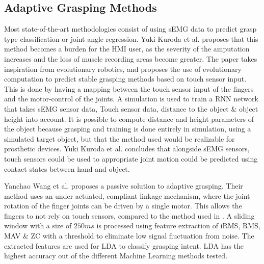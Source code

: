 \documentclass[../main.tex]{subfiles}
\begin{document}
\subsection{Adaptive Grasping Methods}
Most state-of-the-art methodologies consist of using sEMG data to predict grasp type classification or joint angle regression.
Yuki Kuroda et al. \cite{Yuki2023} proposes that this method becomes a burden for the \gls{HMI} user, as the severity of the amputation increases and the loss of muscle recording areas become greater.
The paper takes inspiration from evolutionary robotics, and proposes the use of evolutionary computation to predict stable grasping methods based on touch sensor input.
This is done by having a mapping between the touch sensor input of the fingers and the motor-control of the joints.
A simulation is used to train a \gls{RNN} network that takes sEMG sensor data, Touch sensor data, distance to the object \& object height into account.
It is possible to compute distance and height parameters of the object because grasping and training is done entirely in simulation, using a simulated target object, but that the method used would be realizable for prosthetic devices. 
Yuki Kuroda et al. \cite{Yuki2023} concludes that alongside sEMG sensors, touch sensors could be used to appropriate joint motion could be predicted using contact states between hand and object.

Yanchao Wang et al. \cite{YanchaoWang2022} proposes a passive solution to adaptive grasping.
Their method uses an under actuated, compliant linkage mechanism, where the joint rotation of the finger joints can be driven by a single motor.
This allows the fingers to not rely on touch sensors, compared to the method used in \cite{Yuki2023}.
A sliding window with a size of $250ms$ is processed using feature extraction of \gls{iRMS}, \gls{RMS}, \gls{MAV} \& \gls{ZC} with a threshold to eliminate low signal fluctuation from noise.
The extracted features are used for \gls{LDA} to classify grasping intent. 
LDA has the highest accuracy out of the different Machine Learning methods tested.
\end{document}
